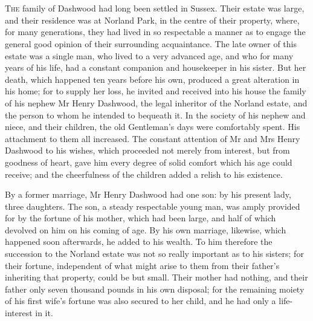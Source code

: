 \chapter[Chapter \thechapter]{}
\lettrine[lraise=0.3]{T}{he} family of Dashwood had long been settled in Sussex. Their estate was large, and their residence was at Norland Park, in the centre of their property, where, for many generations, they had lived in so respectable a manner as to engage the general good opinion of their surrounding acquaintance. The late owner of this estate was a single man, who lived to a very advanced age, and who for many years of his life, had a constant companion and housekeeper in his sister. But her death, which happened ten years before his own, produced a great alteration in his home; for to supply her loss, he invited and received into his house the family of his nephew Mr Henry Dashwood, the legal inheritor of the Norland estate, and the person to whom he intended to bequeath it. In the society of his nephew and niece, and their children, the old Gentleman's days were comfortably spent. His attachment to them all increased. The constant attention of Mr and Mrs Henry Dashwood to his wishes, which proceeded not merely from interest, but from goodness of heart, gave him every degree of solid comfort which his age could receive; and the cheerfulness of the children added a relish to his existence.

By a former marriage, Mr Henry Dashwood had one son: by his present lady, three daughters. The son, a steady respectable young man, was amply provided for by the fortune of his mother, which had been large, and half of which devolved on him on his coming of age. By his own marriage, likewise, which happened soon afterwards, he added to his wealth. To him therefore the succession to the Norland estate was not so really important as to his sisters; for their fortune, independent of what might arise to them from their father's inheriting that property, could be but small. Their mother had nothing, and their father only seven thousand pounds in his own disposal; for the remaining moiety of his first wife's fortune was also secured to her child, and he had only a life-interest in it.

